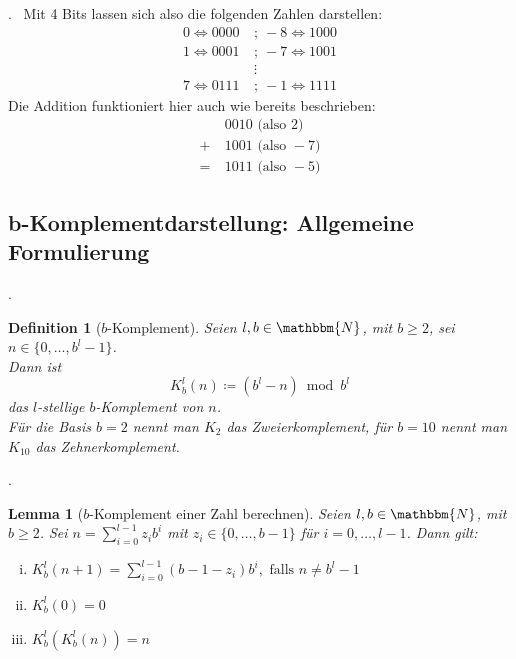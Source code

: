 \documentclass{beamer}
\newcommand{\N}{\mathbbm{N}} %
\newtheorem{defn}[satz]{Definition}
\newtheorem{lem}[satz]{Lemma}
\newcommand{\subsecframe}{\begin{frame}{\insertsectionnumber.\insertsubsectionnumber \ \insertsubsection}}
\begin{document}
        \subsecframe
            Mit 4 Bits lassen sich also die folgenden Zahlen darstellen:
            \begin{align*}
                0 \Leftrightarrow 0000  ~&;~  -8 \Leftrightarrow 1000 \\
                1 \Leftrightarrow 0001  ~&;~  -7 \Leftrightarrow 1001 \\
                & \vdots \\
                7 \Leftrightarrow 0111  ~&;~  -1 \Leftrightarrow 1111
            \end{align*}    
            Die Addition funktioniert hier auch wie bereits beschrieben:
            \begin{align*}
                &0010 \text{ (also } 2) \\
                +~ &1001 \text{ (also } -7) \\
                =~ &1011 \text{ (also } -5)
            \end{align*}
        \end{frame}

    \subsection{b-Komplementdarstellung: Allgemeine Formulierung}

        \subsecframe
            \begin{defn}[$b$-Komplement] \label{def:b-Komplement}
                Seien $l,b \in \N$, mit $b\geq 2$, sei $n \in \{0, \dots, b^l-1\}$. \\
                \vspace{\baselineskip}
                Dann ist 
                \[K^l_b(n) \coloneq (b^l-n) \bmod b^l\]
                das $l$-stellige $b$-Komplement von $n$. \\
                \vspace{\baselineskip}
                Für die Basis $b=2$ nennt man $K_2$ das Zweierkomplement, für $b=10$ nennt man $K_{10}$ das Zehnerkomplement.
            \end{defn}
        \end{frame}

        \subsecframe
            \begin{lem}[$b$-Komplement einer Zahl berechnen]\label{lem:b-Komplement_berechnen}
                Seien $l,b \in \N$, mit $b\geq 2$. Sei $n=\sum_{i=0}^{l-1} z_ib^i$ mit $z_i \in \{0, \dots, b-1\}$ für $i = 0, \dots, l-1$.
                Dann gilt:
                \begin{enumerate}[(i)]
                \item $K^l_b(n+1) = \displaystyle\sum_{i=0}^{l-1}(b-1-z_i)b^i, \text{ falls } n\neq b^l-1$ \label{lem:b-Komplement_berechnen_Berechnung}
                \item $K^l_b(0)=0$ \label{lem:b-Komplement_berechnen_von0} 
                \item $K^l_b(K^l_b(n))=n$ \label{lem:b-Komplement_berechnen_KomplementKomplement} 
                \end{enumerate}                
            \end{lem}
        \end{frame}
\end{document}
